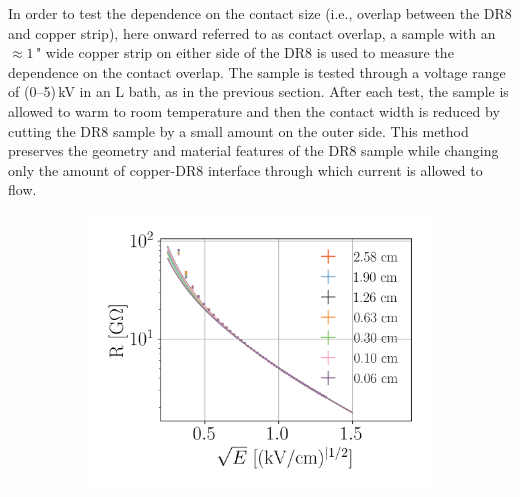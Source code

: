 \documentclass[a4paper,12pt]{article}
\newcommand{\DR}{DR8}
\begin{document}
In order to test the dependence on the contact size (i.e., overlap between the {\DR} and copper strip), here onward referred to as contact overlap, a  sample with an $\approx 1$\," wide copper strip on either side of the {\DR} is used to measure the dependence on the contact overlap.  The sample is tested through a voltage range of (0--5)\,kV in an L bath, as in the previous section.  After each test, the sample is allowed to warm to room temperature and then the contact width is reduced by cutting the {\DR} sample by a small amount on the outer side.  This method preserves the geometry and material features of the {\DR} sample while changing only the amount of copper-{\DR} interface through which current is allowed to flow.


\begin{figure}[htb]
\centering
\begin{subfigure}[c]{0.32\textheight}
\begin{center}
    \includegraphics[width=\textwidth]{TLM_contact_resistance.png}
    

\end{center}
\end{subfigure}
\end{figure}
\end{document}
